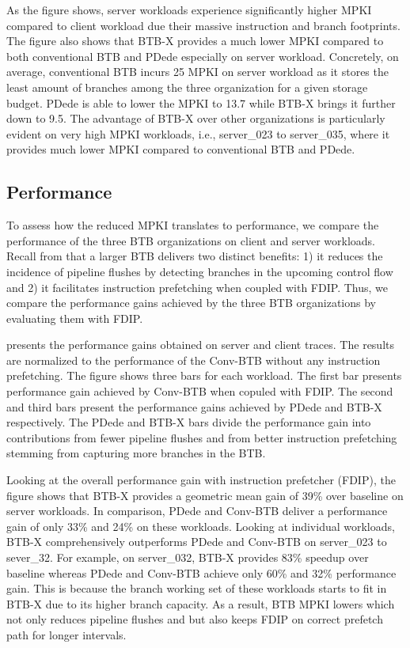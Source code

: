 As the figure shows, server workloads experience significantly higher MPKI compared to client workload due their massive instruction and branch footprints. The figure also shows that BTB-X provides a much lower MPKI compared to both conventional BTB and PDede especially on server workload. Concretely, on average, conventional BTB incurs 25 MPKI on server workload as it stores the least amount of branches among the three organization for a given storage budget. PDede is able to lower the MPKI to 13.7 while BTB-X brings it further down to 9.5. The advantage of BTB-X over other organizations is particularly evident on very high MPKI workloads, i.e., server\_023 to server\_035, where it provides much lower MPKI compared to conventional BTB and PDede.

\subsection{Performance}
\label{sec:perfAll}

To assess how the reduced MPKI translates to performance, we compare the performance of the three BTB organizations on client and server workloads. Recall from  that a larger BTB delivers two distinct benefits: 1) it reduces the incidence of pipeline flushes by detecting branches in the upcoming control flow and 2) it facilitates instruction prefetching when coupled with FDIP. Thus, we compare the performance gains achieved by the three BTB organizations by evaluating them with FDIP.

 presents the performance gains obtained on server and client traces. The results are normalized to the performance of the Conv-BTB without any instruction prefetching. The figure shows three bars for each workload. The first bar presents performance gain achieved by Conv-BTB when copuled with FDIP. The second and third bars present the performance gains achieved by PDede and BTB-X respectively. The PDede and BTB-X bars divide the performance gain into contributions from fewer pipeline flushes and from better instruction prefetching stemming from capturing more branches in the BTB.

Looking at the overall performance gain with instruction prefetcher (FDIP), the figure shows that BTB-X provides a geometric mean gain of 39\% over baseline on server workloads. In comparison, PDede and Conv-BTB deliver a performance gain of only 33\% and 24\% on these workloads. Looking at individual workloads, BTB-X comprehensively outperforms PDede and Conv-BTB on server\_023 to sever\_32. For example, on server\_032, BTB-X provides 83\% speedup over baseline whereas PDede and Conv-BTB achieve only 60\% and 32\% performance gain. This is because the branch working set of these workloads starts to fit in BTB-X due to its higher branch capacity. As a result, BTB MPKI lowers which not only reduces pipeline flushes and but also keeps FDIP on correct prefetch path for longer intervals.

